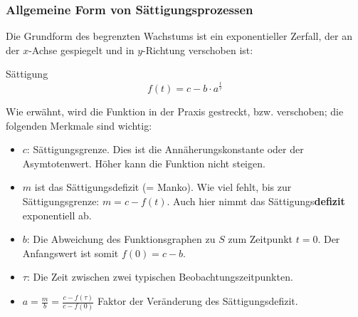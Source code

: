 \newpage

\subsubsection{Allgemeine Form von Sättigungsprozessen}

\begin{center}
\end{center}

Die Grundform des begrenzten Wachstums ist ein exponentieller Zerfall,
der an der $x$-Achse gespiegelt und in $y$-Richtung
verschoben ist:

\begin{definition}{Sättigung}{}
$$f(t) =c - b\cdot{} a^{\frac{t}{\tau}}$$
\end{definition}

Wie erwähnt, wird die Funktion in der Praxis gestreckt, bzw. verschoben; die folgenden Merkmale sind wichtig:

\begin{itemize}
	\item $c$: Sättigungsgrenze. Dies ist die Annäherungskonstante oder der Asymtotenwert. Höher kann die Funktion nicht steigen.

	\item $m$ ist das Sättigungsdefizit (= Manko). Wie viel fehlt, bis zur
    Sättigungsgrenze: $m = c - f(t)$. Auch hier nimmt das  Sättigungs\textbf{defizit} exponentiell ab.
	\item $b$: Die Abweichung des Funktionsgraphen zu $S$ zum Zeitpunkt $t=0$. Der
    Anfangswert ist somit $f(0) = c - b$.
	\item $\tau$: Die Zeit zwischen zwei typischen
    Beobachtungszeitpunkten.
\item $a=\frac{m}{b}=\frac{c-f(\tau)}{c-f(0)}$ Faktor der Veränderung des Sättigungsdefizit.
\end{itemize}


